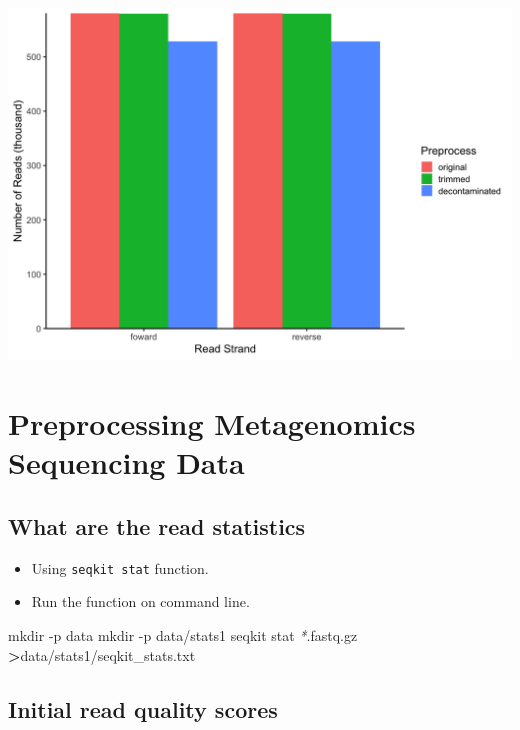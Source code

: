 \documentclass[
  12pt,
  openany]{book}
\newenvironment{Shaded}{\begin{snugshade}}{\end{snugshade}}
\newcommand{\AttributeTok}[1]{\textcolor[rgb]{0.77,0.63,0.00}{#1}}
\newcommand{\ExtensionTok}[1]{#1}
\newcommand{\FunctionTok}[1]{\textcolor[rgb]{0.00,0.00,0.00}{#1}}
\newcommand{\NormalTok}[1]{#1}
\newcommand{\OperatorTok}[1]{\textcolor[rgb]{0.81,0.36,0.00}{\textbf{#1}}}
\newcommand{\PreprocessorTok}[1]{\textcolor[rgb]{0.56,0.35,0.01}{\textit{#1}}}
\providecommand{\tightlist}{%
  \setlength{\itemsep}{0pt}\setlength{\parskip}{0pt}}
\begin{document}
\begin{center}\includegraphics[width=0.8\linewidth,height=0.4\textheight]{./Figures/unnamed-chunk-2-1} \end{center}

\hypertarget{preprocess-metag-reads}{%
\chapter{Preprocessing Metagenomics Sequencing Data}\label{preprocess-metag-reads}}

\hypertarget{what-are-the-read-statistics}{%
\section{What are the read statistics}\label{what-are-the-read-statistics}}

\begin{itemize}
\tightlist
\item
  Using \texttt{seqkit\ stat} function.
\item
  Run the function on command line.
\end{itemize}

\begin{Shaded}
\begin{Highlighting}[]
\FunctionTok{mkdir} \AttributeTok{{-}p}\NormalTok{ data}
\FunctionTok{mkdir} \AttributeTok{{-}p}\NormalTok{ data/stats1  }
\ExtensionTok{seqkit}\NormalTok{ stat }\PreprocessorTok{*}\NormalTok{.fastq.gz }\OperatorTok{\textgreater{}}\NormalTok{data/stats1/seqkit\_stats.txt}
\end{Highlighting}
\end{Shaded}

\hypertarget{initial-read-quality-scores-1}{%
\section{Initial read quality scores}\label{initial-read-quality-scores-1}}
\end{document}
